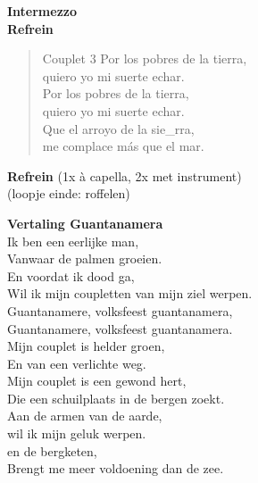 \textbf{Intermezzo}\\
\textbf{Refrein}\\

\begin{verse}{Couplet 3}
  \hspace{1em} Por los pobres de la tierra,
  \\
  \hspace{1em} quiero yo mi suerte echar.
  \\
  \hspace{1em} Por los pobres de la tierra,
  \\
  quiero yo mi suerte echar.
  \\
  Que el arroyo de la sie\_rra,
  \\
  me complace m\'{a}s que el mar. \hspace{1em}
\end{verse}

\textbf{Refrein} (1x \`{a} capella, 2x met instrument)\\
(loopje einde:  roffelen)

\textbf{Vertaling Guantanamera}\\
Ik ben een eerlijke man,\\
Vanwaar de palmen groeien.\\
En voordat ik dood ga,\\
Wil ik mijn coupletten van mijn ziel werpen.\\
\vspace*{1\baselineskip}
Guantanamere, volksfeest guantanamera,\\
Guantanamere, volksfeest guantanamera.\\
\vspace*{1\baselineskip}
Mijn couplet is helder groen,\\
En van een verlichte weg.\\
Mijn couplet is een gewond hert,\\
Die een schuilplaats in de bergen zoekt.\\
\vspace*{1\baselineskip}
Aan de armen van de aarde,\\
wil ik mijn geluk werpen.\\
en de bergketen,\\
Brengt me meer voldoening dan de zee.\\
